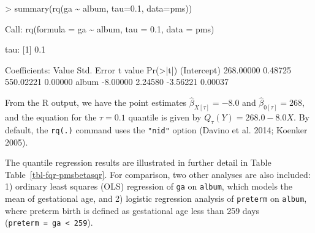 \documentclass[
  letterpaper,
  DIV=11,
  numbers=noendperiod]{scrartcl}
\newenvironment{Shaded}{\begin{snugshade}}{\end{snugshade}}
\newcommand{\AttributeTok}[1]{\textcolor[rgb]{0.40,0.45,0.13}{#1}}
\newcommand{\DecValTok}[1]{\textcolor[rgb]{0.68,0.00,0.00}{#1}}
\newcommand{\ErrorTok}[1]{\textcolor[rgb]{0.68,0.00,0.00}{#1}}
\newcommand{\FloatTok}[1]{\textcolor[rgb]{0.68,0.00,0.00}{#1}}
\newcommand{\FunctionTok}[1]{\textcolor[rgb]{0.28,0.35,0.67}{#1}}
\newcommand{\NormalTok}[1]{\textcolor[rgb]{0.00,0.23,0.31}{#1}}
\newcommand{\SpecialCharTok}[1]{\textcolor[rgb]{0.37,0.37,0.37}{#1}}
\begin{document}
\begin{Shaded}
\begin{Highlighting}[]
\SpecialCharTok{\textgreater{}} \FunctionTok{summary}\NormalTok{(}\FunctionTok{rq}\NormalTok{(ga }\SpecialCharTok{\textasciitilde{}}\NormalTok{ album, }\AttributeTok{tau=}\FloatTok{0.1}\NormalTok{, }\AttributeTok{data=}\NormalTok{pms))}

\NormalTok{Call}\SpecialCharTok{:} \FunctionTok{rq}\NormalTok{(}\AttributeTok{formula =}\NormalTok{ ga }\SpecialCharTok{\textasciitilde{}}\NormalTok{ album, }\AttributeTok{tau =} \FloatTok{0.1}\NormalTok{, }\AttributeTok{data =}\NormalTok{ pms)}

\NormalTok{tau}\SpecialCharTok{:}\NormalTok{ [}\DecValTok{1}\NormalTok{] }\FloatTok{0.1}

\NormalTok{Coefficients}\SpecialCharTok{:}
\NormalTok{            Value     Std. Error t value   }\FunctionTok{Pr}\NormalTok{(}\SpecialCharTok{\textgreater{}}\ErrorTok{|}\NormalTok{t}\SpecialCharTok{|}\NormalTok{)}
\NormalTok{(Intercept) }\FloatTok{268.00000}   \FloatTok{0.48725}  \FloatTok{550.02221}   \FloatTok{0.00000}
\NormalTok{album        }\SpecialCharTok{{-}}\FloatTok{8.00000}   \FloatTok{2.24580}   \SpecialCharTok{{-}}\FloatTok{3.56221}   \FloatTok{0.00037}
\end{Highlighting}
\end{Shaded}

From the R output, we have the point estimates
\(\hat{\beta}_{X [\tau]}=-8.0\) and \(\hat{\beta}_{0 [\tau]}=268\), and
the equation for the \(\tau=0.1\) quantile is given by
\(Q_{\tau}(Y) = 268.0 - 8.0 X\). By default, the \texttt{rq(.)} command
uses the \texttt{"nid"} option (Davino et al. 2014; Koenker 2005).

The quantile regression results are illustrated in further detail in
Table Table~\ref{tbl-fqr-pmsbetasqr}. For comparison, two other analyses
are also included: 1) ordinary least squares (OLS) regression of
\texttt{ga} on \texttt{album}, which models the mean of gestational age,
and 2) logistic regression analysis of \texttt{preterm} on
\texttt{album}, where preterm birth is defined as gestational age less
than 259 days (\texttt{preterm\ =\ ga\ \textless{}\ 259}).
\end{document}

